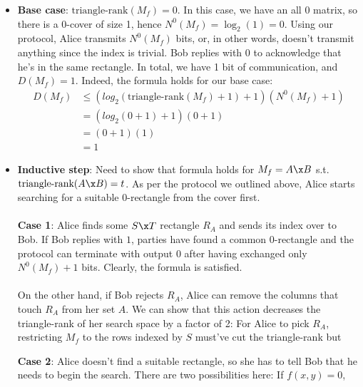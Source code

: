 \documentclass{article}
\newcommand\tr{\textrm{triangle-rank}}
\begin{document}
\begin{enumerate}
\begin{enumerate}
\begin{itemize}
                \item \textbf{Base case}: $\tr(M_f) = 0$. In this case, we have
                    an all $0$ matrix, so there is a 0-cover of size 1, hence
                    $N^0(M_f) = \log_2(1) = 0$. Using our protocol, Alice
                    transmits $N^0(M_f)$ bits, or, in other words, doesn't
                    transmit anything since the index is trivial. Bob replies
                    with 0 to acknowledge that he's in the same rectangle. In
                    total, we have 1 bit of communication, and $D(M_f) = 1$.
                    Indeed, the formula holds for our base case:
                    \begin{align*}
                        D(M_f) &\leq (log_2(\tr(M_f) + 1) +1) (N^0(M_f) + 1)
                            \\ &= (log_2(0 + 1) +1) (0 + 1)
                            \\ &= (0+1) (1)
                            \\ &= 1
                    \end{align*}
                \item \textbf{Inductive step}: Need to show that formula holds
                    for $M_f = A \x B$ s.t. $\tr(A \x B) = t$. As per the
                    protocol we outlined above, Alice starts searching for a
                    suitable 0-rectangle from the cover first.
                    \\\\
                    \textbf{Case 1}: Alice finds some $S \x T$ rectangle $R_A$
                    and sends its index over to Bob. If Bob replies with $1$,
                    parties have found a common 0-rectangle and the protocol
                    can terminate with output $0$ after having exchanged only
                    $N^0(M_f) + 1$ bits. Clearly, the formula is satisfied.
                    \\\\
                    On the other hand, if Bob rejects $R_A$, Alice can remove
                    the columns that touch $R_A$ from her set $A$. We can show
                    that this action decreases the triangle-rank of her search
                    space by a factor of 2: For Alice to pick $R_A$,
                    restricting $M_f$ to the rows indexed by $S$ must've cut
                    the triangle-rank but 

                    \textbf{Case 2}: Alice doesn't find a suitable rectangle,
                    so she has to tell Bob that he needs to begin the search.
                    There are two possibilities here: If $f(x,y) = 0$, 
            \end{itemize}


\end{enumerate}
\end{enumerate}
\end{document}
